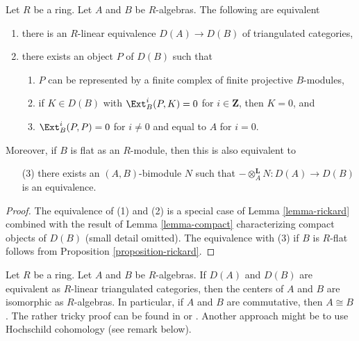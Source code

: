 \begin{lemma}
\label{lemma-rickard-rings}
Let $R$ be a ring.
Let $A$ and $B$ be $R$-algebras. The following are equivalent
\begin{enumerate}
\item there is an $R$-linear equivalence $D(A) \to D(B)$
of triangulated categories,
\item there exists an object $P$ of $D(B)$ such that
\begin{enumerate}
\item $P$ can be represented by a finite complex
of finite projective $B$-modules,
\item if $K \in D(B)$ with $\Ext^i_B(P, K) = 0$ for
$i \in \mathbf{Z}$, then $K = 0$, and
\item $\Ext^i_B(P, P) = 0$ for $i \not = 0$ and
equal to $A$ for $i= 0$.
\end{enumerate}
\end{enumerate}
Moreover, if $B$ is flat as an $R$-module, then this is also
equivalent to
\begin{enumerate}
\item[(3)] there exists an $(A, B)$-bimodule $N$ such that
$- \otimes_A^\mathbf{L} N : D(A) \to D(B)$ is an equivalence.
\end{enumerate}
\end{lemma}

\begin{proof}
The equivalence of (1) and (2) is a special case of
Lemma \ref{lemma-rickard} combined with the result of
Lemma \ref{lemma-compact} characterizing compact objects of $D(B)$
(small detail omitted).
The equivalence with (3) if $B$ is $R$-flat follows from
Proposition \ref{proposition-rickard}.
\end{proof}

\begin{remark}
\label{remark-centers}
Let $R$ be a ring. Let $A$ and $B$ be $R$-algebras.
If $D(A)$ and $D(B)$ are equivalent as $R$-linear triangulated
categories, then the centers of $A$ and $B$ are isomorphic
as $R$-algebras. In particular, if $A$ and $B$ are commutative,
then $A \cong B$. The rather tricky proof can be found in
\cite[Proposition 9.2]{Rickard} or \cite[Proposition 6.3.2]{KZ}.
Another approach might be to use Hochschild cohomology (see
remark below).
\end{remark}


